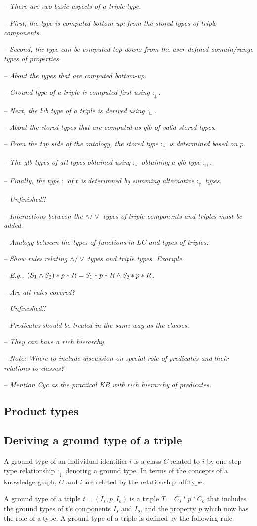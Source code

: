 \documentclass[runningheads]{llncs}
\newcommand{\darr}{\downarrow}
\newcommand{\uarr}{\uparrow}
\newcommand{\notes}[1]{\noindent\begin{small}-- \emph{#1}\\\end{small}}
\begin{document}
\notes{There are two basic aspects of a triple type.}
\notes{First, the type is computed bottom-up: from the stored types of triple components.}
\notes{Second, the type can be computed top-down: from the user-defined domain/range types of properties.}

\notes{About the types that are computed bottom-up.}
\notes{Ground type of a triple is computed first using $:_\darr$.}
\notes{Next, the lub type of a triple is derived using $:_\sqcup$.}

\notes{About the stored types that are computed as glb of valid stored types.}
\notes{From the top side of the ontology, the stored type $:_\uarr$ is determined based on $p$.}
\notes{The glb types of all types obtained using $:_\uarr$ obtaining a glb type $:_\sqcap$.}
\notes{Finally, the type $:$ of $t$ is deterimned by summing alternative $:_\uarr$ types.}

\notes{Unfinished!!}
\notes{Interactions between the $\land/\lor$ types of triple components and triples must be added.}
\notes{Analogy between the types of functions in LC and types of triples.}
\notes{Show rules relating $\land/\lor$ types and triple types. Example.}
\notes{E.g., $(S_1\land\/S_2)*p*R = S_1*p*R\land\/S_2*p*R$.}
\notes{Are all rules covered?}

\notes{Unfinished!!}

\notes{Predicates should be treated in the same way as the classes.}
\notes{They can have a rich hierarchy.}
\notes{\emph{Note:} Where to include discussion on special role of predicates and their relations to classes?}
\notes{Mention Cyc as the practical KB with rich hierarchy of predicates.}



\subsection{Product types}



\subsection{Deriving a ground type of a triple}

\noindent
A ground type of an individual identifier $i$ is a class $C$ related
to $i$ by one-step type relationship $:_\darr$ denoting a ground
type. In terms of the concepts of a knowledge graph, $C$ and $i$ are
related by the relationship rdf:type.

A ground type of a triple $t=(I_s,p,I_o)$ is a triple $T=C_s*p*C_o$ that
includes the ground types of $t$'s components $I_s$ and $I_o$, and the
property $p$ which now has the role of a type. A ground type of a
triple is defined by the following rule.
\end{document}
